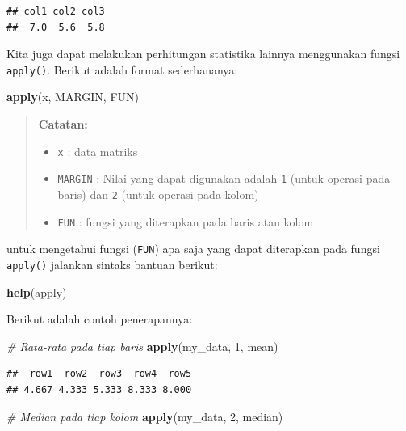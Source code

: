 \documentclass[
]{book}
\newenvironment{Shaded}{\begin{snugshade}}{\end{snugshade}}
\newcommand{\CommentTok}[1]{\textcolor[rgb]{0.56,0.35,0.01}{\textit{#1}}}
\newcommand{\DecValTok}[1]{\textcolor[rgb]{0.00,0.00,0.81}{#1}}
\newcommand{\FunctionTok}[1]{\textcolor[rgb]{0.13,0.29,0.53}{\textbf{#1}}}
\newcommand{\NormalTok}[1]{#1}
\providecommand{\tightlist}{%
  \setlength{\itemsep}{0pt}\setlength{\parskip}{0pt}}
\theoremstyle{definition}
\theoremstyle{definition}
\theoremstyle{definition}
\theoremstyle{definition}
\theoremstyle{remark}
\begin{document}
\begin{verbatim}
## col1 col2 col3 
##  7.0  5.6  5.8
\end{verbatim}

Kita juga dapat melakukan perhitungan statistika lainnya menggunakan fungsi \texttt{apply()}. Berikut adalah format sederhananya:

\begin{Shaded}
\begin{Highlighting}[]
\FunctionTok{apply}\NormalTok{(x, MARGIN, FUN)}
\end{Highlighting}
\end{Shaded}

\begin{quote}
\textbf{Catatan:}

\begin{itemize}
\tightlist
\item
  \texttt{x} : data matriks
\item
  \texttt{MARGIN} : Nilai yang dapat digunakan adalah \texttt{1} (untuk operasi pada baris) dan \texttt{2} (untuk operasi pada kolom)
\item
  \texttt{FUN} : fungsi yang diterapkan pada baris atau kolom
\end{itemize}
\end{quote}

untuk mengetahui fungsi (\texttt{FUN}) apa saja yang dapat diterapkan pada fungsi \texttt{apply()} jalankan sintaks bantuan berikut:

\begin{Shaded}
\begin{Highlighting}[]
\FunctionTok{help}\NormalTok{(apply)}
\end{Highlighting}
\end{Shaded}

Berikut adalah contoh penerapannya:

\begin{Shaded}
\begin{Highlighting}[]
\CommentTok{\# Rata{-}rata pada tiap baris}
\FunctionTok{apply}\NormalTok{(my\_data, }\DecValTok{1}\NormalTok{, mean)}
\end{Highlighting}
\end{Shaded}

\begin{verbatim}
##  row1  row2  row3  row4  row5 
## 4.667 4.333 5.333 8.333 8.000
\end{verbatim}

\begin{Shaded}
\begin{Highlighting}[]
\CommentTok{\# Median pada tiap kolom}
\FunctionTok{apply}\NormalTok{(my\_data, }\DecValTok{2}\NormalTok{, median)}
\end{Highlighting}
\end{Shaded}
\end{document}
